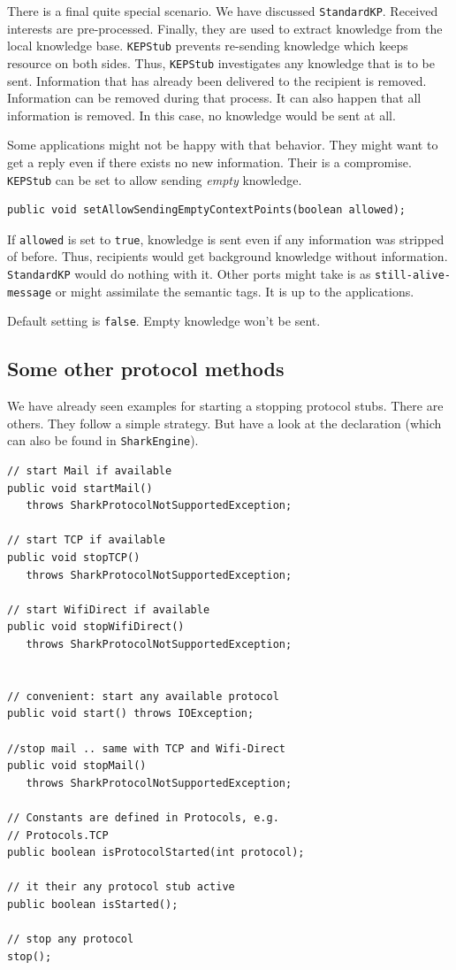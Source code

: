 There is a final quite special scenario. 
We have discussed {\tt StandardKP}. Received interests are pre-processed. Finally, they are used to extract knowledge from the local knowledge base. {\tt KEPStub} prevents re-sending knowledge which keeps resource on both sides.
Thus, {\tt KEPStub} investigates any knowledge that is to be sent. Information that has already been delivered to the recipient is removed. Information can be removed during that process. It can also happen that all information is removed. In this case, no knowledge would be sent at all.

Some applications might not be happy with that behavior. They might want to get a reply even if there exists no new information. Their is a compromise. {\tt KEPStub} can be set to allow sending {\it empty} knowledge.

\begin{verbatim}
public void setAllowSendingEmptyContextPoints(boolean allowed);
\end{verbatim}

If {\tt allowed} is set to {\tt true}, knowledge is sent even if any information was stripped of before. Thus, recipients would get background knowledge without information. {\tt StandardKP} would do nothing with it. Other ports might take is as {\tt still-alive-message} or might assimilate the semantic tags. It is up to the applications.

Default setting is {\tt false}. Empty knowledge won't be sent.

\subsection{Some other protocol methods}
We have already seen examples for starting a stopping protocol stubs. 
There are others. They follow a simple strategy. But have a look at the
declaration (which can also be found in {\tt SharkEngine}).

\begin{verbatim}
// start Mail if available
public void startMail()
   throws SharkProtocolNotSupportedException;

// start TCP if available
public void stopTCP() 
   throws SharkProtocolNotSupportedException;

// start WifiDirect if available
public void stopWifiDirect() 
   throws SharkProtocolNotSupportedException;


// convenient: start any available protocol
public void start() throws IOException;

//stop mail .. same with TCP and Wifi-Direct
public void stopMail()
   throws SharkProtocolNotSupportedException;

// Constants are defined in Protocols, e.g.
// Protocols.TCP
public boolean isProtocolStarted(int protocol);

// it their any protocol stub active
public boolean isStarted();

// stop any protocol
stop();
\end{verbatim}

